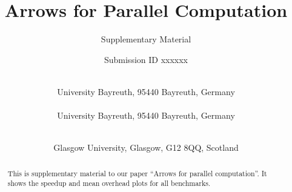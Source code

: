 \documentclass[final]{jfp1}
\title{Arrows for Parallel Computation}
\subtitle{Supplementary Material}
\author{Submission ID xxxxxx}
\author[M. Braun, O. Lobachev, and P. Trinder]%
        {\textls*{MARTIN BRAUN}\\
         University Bayreuth, 95440 Bayreuth, Germany\\
		 \textls*{OLEG LOBACHEV}\\
		 University Bayreuth, 95440 Bayreuth, Germany\\
		 \and\ \textls*{PHIL TRINDER}\\
		 Glasgow University, Glasgow, G12 8QQ, Scotland}
\begin{document}
\label{firstpage}

\def\SymbReg{\textsuperscript{\textregistered}}

\maketitle

\begin{abstract}
  This is supplementary material to our paper \enquote{Arrows for
    parallel computation}. It shows the speedup and mean overhead
  plots for all benchmarks.
\end{abstract}

\tableofcontents
%

\newlength{\plotwidthDist}
\setlength{\plotwidthDist}{0.6\textwidth}
\newlength{\plotwidthSMP}
\setlength{\plotwidthSMP}{\plotwidthDist}

\newcommand{\meanOverheadPlot}[5]{
\begin{tikzpicture}
\begin{axis}[title={#1},
title style={align=center},
scale only axis, width=\plotwidthDist,
xlabel=Threads,
ytick distance=#2 / 4,
xtick distance=#3,
minor tick num=9,
ylabel=Overhead,
ylabel near ticks,
grid=both,
legend entries={Mean Overhead},
legend style={at={(0.99,0.99)},anchor=north east},
max space between ticks=50pt,
grid style={line width=.1pt, draw=gray!10},
major grid style={line width=.2pt,draw=gray!50},
ymin=-#2,
ymax=#2,
xmin=-1,
xmax=#4]
\addplot+[mark=*,very thick,error bars/.cd,
    y dir=both,y explicit] table [x="nCores", y="overhead", y error="stdDevForOverhead", col sep=comma, mark=dots,
smooth]{#5};
\end{axis}
\end{tikzpicture}
}

\newcommand{\speedupplot}[8]{
\begin{tikzpicture}
\begin{axis}[title={#1},
title style={align=center},
scale only axis, width=#7,
xlabel=Threads,
xtick distance=#4,
ytick distance=#4,
ylabel=Speedup,
ylabel near ticks,
grid=major,
legend entries={linear, #2},
legend style={at={(0.01,0.99)},anchor=north west},
max space between ticks=50pt,
grid style={line width=.1pt, draw=gray!10},
major grid style={line width=.2pt,draw=gray!50},
ymin=-1,
xmin=-1,
ymax=#8,
xmax=#6]
\addplot [domain=0:#3, no markers,dotted,thick]{x};
#5
\end{axis}
\end{tikzpicture}
}
\end{document}
